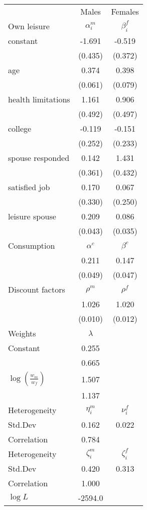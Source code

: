 \begin{tabular}{lcc} 
\hline\hline 
 & Males & Females \\ 
Own leisure & $\alpha_{i}^{m}$ & $\beta_{i}^{f}$ \\ 
constant & -1.691 & -0.519 \\ 
 & (0.435) & (0.372) \\ 
age & 0.374 & 0.398 \\ 
 & (0.061) & (0.079) \\ 
health limitations & 1.161 & 0.906 \\ 
 & (0.492) & (0.497) \\ 
college & -0.119 & -0.151 \\ 
 & (0.252) & (0.233) \\ 
spouse responded & 0.142 & 1.431 \\ 
 & (0.361) & (0.432) \\ 
satisfied job & 0.170 & 0.067 \\ 
 & (0.330) & (0.250) \\ 
leisure spouse & 0.209 & 0.086 \\ 
 & (0.043) & (0.035) \\ 
Consumption & $\alpha^{c}$ & $\beta^{c}$ \\ 
 & 0.211 & 0.147 \\ 
 & (0.049) & (0.047) \\ 
Discount factors & $\rho^m$ & $\rho^f$ \\ 
 & 1.026 & 1.020 \\ 
 & (0.010) & (0.012) \\ 
Weights & $\lambda$ &  \\ 
Constant & 0.255 &  \\ 
 & 0.665 &  \\ 
$\log(\frac{w_m}{w_f})$ & 1.507 &  \\ 
 & 1.137 &  \\ 
Heterogeneity & $\eta_i^m$ & $\nu_i^f$ \\ 
Std.Dev & 0.162 & 0.022 \\ 
Correlation & 0.784 &  \\ 
Heterogeneity & $\zeta_i^m$ & $\zeta_i^f$ \\ 
Std.Dev & 0.420 & 0.313 \\ 
Correlation & 1.000 &  \\ 
\hline 
$\log L$ & -2594.0 & \\ 
\hline \hline 
\end{tabular} 
